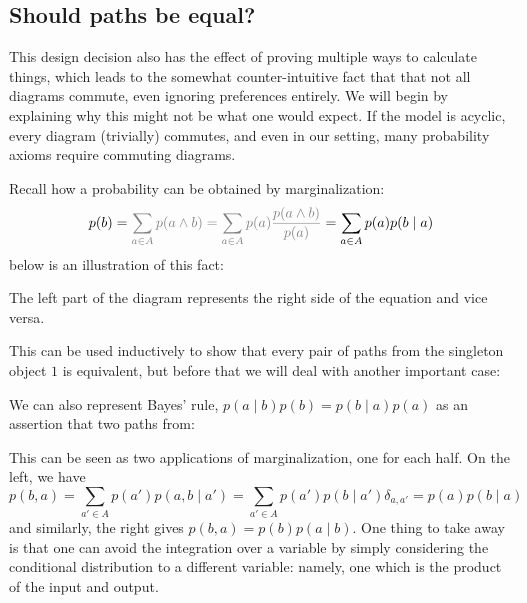 \documentclass{article}
\begin{document}
	
	\subsection{Should paths be equal?}
	
	This design decision also has the effect of proving multiple ways to calculate things, which leads to the somewhat counter-intuitive fact that that not all diagrams commute, even ignoring preferences entirely. We will begin by explaining why this might not be what one would expect. If the model is acyclic, every diagram (trivially) commutes, and even in our setting, many probability axioms require commuting diagrams.
	
	\begin{example}[Marginalization]
		Recall how a probability can be obtained by marginalization:
		\[ p(b) = {\color{gray}\sum_{a \in A} p(a \land b) = \sum_{a \in A} p(a) \frac{p(a\land b)}{p(a)} }= \sum_{a \in A} p(a) p(b\mid a) \]
		below is an illustration of this fact:
		\begin{center}
		\end{center}
		The left part of the diagram represents the right side of the equation and vice versa. 
	\end{example} 

	This can be used inductively to show that every pair of paths from the singleton object $1$ is equivalent, but before that we will deal with another important case:
	
	\begin{example} 
		We can also represent Bayes' rule, $p(a \mid b) p(b) = p(b \mid a) p(a)$ as an assertion that two paths from:
		\begin{center}
		\end{center}
		This can be seen as two applications of marginalization, one for each half. On the left, we have
		\[ p(b, a) = \sum_{a' \in A} p(a')p(a,b \mid a') = \sum_{a' \in A} p(a') p(b \mid a') \delta_{a,a'} = p(a) p(b \mid a) \]
		and similarly, the right gives $p(b,a) = p(b) p(a \mid b)$. One thing to take away is that one can avoid the integration over a variable by simply considering the conditional distribution to a different variable: namely, one which is the product of the input and output. 
	\end{example}
	
\end{document}
